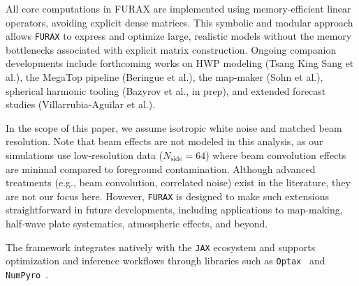 \documentclass[fleqn,usenatbib]{mnras}
\begin{document}
All core computations in FURAX are implemented using memory-efficient linear operators, avoiding explicit dense matrices. This symbolic and modular approach allows \texttt{FURAX} to express and optimize large, realistic models without the memory bottlenecks associated with explicit matrix construction. Ongoing companion developments include forthcoming works on HWP modeling (Tsang King Sang et al.), the MegaTop pipeline (Beringue et al.), the map-maker (Sohn et al.), spherical harmonic tooling (Bazyrov et al., in prep), and extended forecast studies (Villarrubia-Aguilar et al.).


In the scope of this paper, we assume isotropic white noise and matched beam resolution. Note that beam effects are not modeled in this analysis, as our simulations use low-resolution data ($N_{\text{side}} = 64$) where beam convolution effects are minimal compared to foreground contamination. Although advanced treatments (e.g., beam convolution, correlated noise) exist in the literature, they are not our focus here. However, \texttt{FURAX} is designed to make such extensions straightforward in future developments, including applications to map-making, half-wave plate systematics, atmospheric effects, and beyond.

The framework integrates natively with the \texttt{JAX} ecosystem and supports optimization and inference workflows through libraries such as \texttt{Optax}~\citep{optax} and \texttt{NumPyro}~\citep{numpyro}.
\end{document}
